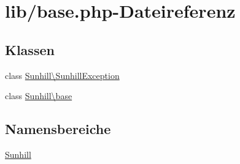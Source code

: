 \hypertarget{base_8php}{}\section{lib/base.php-\/\+Dateireferenz}
\label{base_8php}
\subsection*{Klassen}
\begin{DoxyCompactItemize}
\item 
class \hyperlink{classSunhill_1_1SunhillException}{Sunhill\textbackslash{}\+Sunhill\+Exception}
\item 
class \hyperlink{classSunhill_1_1base}{Sunhill\textbackslash{}base}
\end{DoxyCompactItemize}
\subsection*{Namensbereiche}
\begin{DoxyCompactItemize}
\item 
 \hyperlink{namespaceSunhill}{Sunhill}
\end{DoxyCompactItemize}
